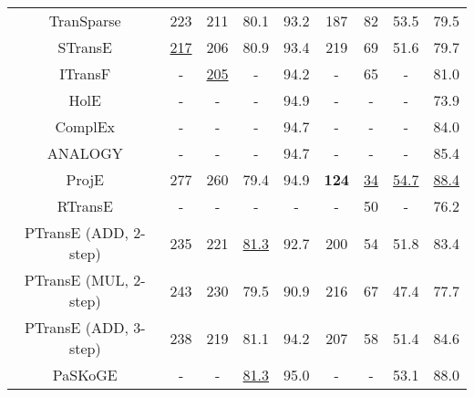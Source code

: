 \documentclass[11pt,a4paper]{article}
\begin{document}
\begin{table*}[t]
\begin{tabular}{|c|c|c|c|c|c|c|c|c|}
TranSparse                                 & 223         & 211             & 80.1         & 93.2             & 187         & 82              & 53.5         & 79.5             \\
STransE                                    & \underline{217}         & 206             & 80.9         & 93.4             & 219         & 69              & 51.6         & 79.7             \\
ITransF                                    & -           & \underline{205}             & -            & 94.2             & -           & 65              & -            & 81.0               \\
HolE                                        & -         & -             & -         & 94.9             & -         & -             & -         & 73.9             \\
ComplEx                                        & -         & -             & -         & 94.7             & -         & -             & -         & 84.0  \\
ANALOGY                                        & -         & -             & -         & 94.7             & -         & -             & -         & 85.4             \\
ProjE                                        & 277         & 260             & 79.4         & 94.9            & \bf{124}         & \underline{34}             & \underline{54.7}         & \underline{88.4}             \\
RTransE                                    & -           & -             & -            & -             & -           & 50              & -            & 76.2             \\
PTransE (ADD, 2-step)                                    & 235         & 221             & \underline{81.3}         & 92.7            & 200         & 54              & 51.8         & 83.4             \\
PTransE (MUL, 2-step)                                    & 243         & 230             & 79.5         & 90.9            & 216         & 67              & 47.4         & 77.7             \\
PTransE (ADD, 3-step)                                    & 238         & 219             & 81.1         & 94.2            & 207         & 58              & 51.4         & 84.6             \\
PaSKoGE                                    & -           & -             & \underline{81.3}            & 95.0             & -           & -              & 53.1            & 88.0             \\

\end{tabular}
\end{table*}
\end{document}
